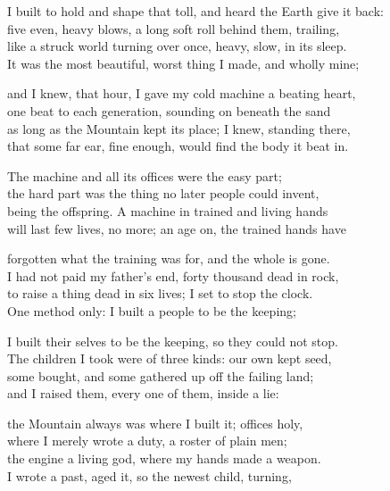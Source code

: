 \begin{founder}
I built to hold and shape that toll, and heard the Earth give it back:\\
five even, heavy blows, a long soft roll behind them, trailing,\\
like a struck world turning over once, heavy, slow, in its sleep.\\
It was the most beautiful, worst thing I made, and wholly mine;\\
\medskip

and I knew, that hour, I gave my cold machine a beating heart,\\
one beat to each generation, sounding on beneath the sand\\
as long as the Mountain kept its place; I knew, standing there,\\
that some far ear, fine enough, would find the body it beat in.

The machine and all its offices were the easy part;\\
the hard part was the thing no later people could invent,\\
being the offspring. A machine in trained and living hands\\
will last few lives, no more; an age on, the trained hands have\\
\medskip

forgotten what the training was for, and the whole is gone.\\
I had not paid my father's end, forty thousand dead in rock,\\
to raise a thing dead in six lives; I set to stop the clock.\\
One method only: I built a people to be the keeping;\\
\medskip

I built their selves to be the keeping, so they could not stop.\\
The children I took were of three kinds: our own kept seed,\\
some bought, and some gathered up off the failing land;\\
and I raised them, every one of them, inside a lie:\\
\medskip

the Mountain always was where I built it; offices holy,\\
where I merely wrote a duty, a roster of plain men;\\
the engine a living god, where my hands made a weapon.\\
I wrote a past, aged it, so the newest child, turning,\\
\medskip


\end{founder}
